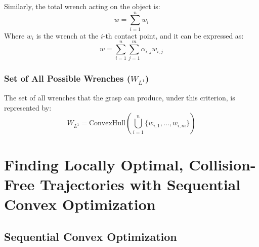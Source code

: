 \documentclass[12pt]{article}
\begin{document}
Similarly, the total wrench acting on the object is:
\[
w = \sum_{i=1}^{n} w_i
\]
Where \(w_i\) is the wrench at the \(i\)-th contact point, and it can be expressed as:
\[
w = \sum_{i=1}^{n} \sum_{j=1}^{m} \alpha_{i,j} w_{i,j}
\]

\subsubsection{Set of All Possible Wrenches (\(W_{L^1}\))}

The set of all wrenches that the grasp can produce, under this criterion, is represented by:
\[
W_{L^1} = \text{ConvexHull}\left( \bigcup_{i=1}^{n} \{w_{i,1}, \ldots, w_{i,m}\} \right)
\]

\newpage
\section{Finding Locally Optimal, Collision-Free Trajectories with Sequential Convex Optimization}

\subsection{Sequential Convex Optimization}
\end{document}
